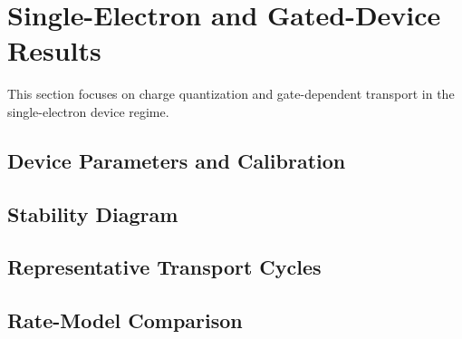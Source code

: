 \section{Single-Electron and Gated-Device Results}
\label{sec:results:singleelectron}

    This section focuses on charge quantization and gate-dependent transport in the single-electron device regime.

    \subsection{Device Parameters and Calibration}
    \label{subsec:results:se:parameters}


    \subsection{Stability Diagram}
    \label{subsec:results:se:diamonds}


    \subsection{Representative Transport Cycles}
    \label{subsec:results:se:cycles}


    \subsection{Rate-Model Comparison}
    \label{subsec:results:se:model}

